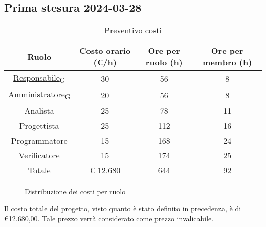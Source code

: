 \subsection{Prima stesura 2024-03-28}
\begin{table}[!h]
	\centering
		\begin{tabular}{ | c | c | c | c | }
			\hline
			\textbf{Ruolo}   & \textbf{Costo orario (€/h)} & \textbf{Ore per ruolo (h)} & \textbf{Ore per membro (h)} \\
			\hline
			\href{https://7last.github.io/docs/rtb/documentazione-interna/glossario\#responsabile}{Responsabile\textsubscript{G}}   & 30           & 56            & 8              \\
			\href{https://7last.github.io/docs/rtb/documentazione-interna/glossario\#amministratore}{Amministratore\textsubscript{G}} & 20           & 56            & 8              \\
			Analista       & 25           & 78            & 11             \\
			Progettista    & 25           & 112           & 16             \\
			Programmatore  & 15           & 168           & 24             \\
			Verificatore   & 15           & 174           & 25             \\
			\hline
			Totale         & € 12.680     & 644           & 92             \\
			\hline
		\end{tabular}
        \caption{Preventivo costi}
\end{table}
\begin{figure}[!h]
    \centering
    \caption{Distribuzione dei costi per ruolo}
\end{figure}
\begin{flushleft}
Il costo totale del progetto, visto quanto è stato definito in precedenza, è di €12.680,00. Tale prezzo verrà considerato come prezzo invalicabile.
\end{flushleft}
